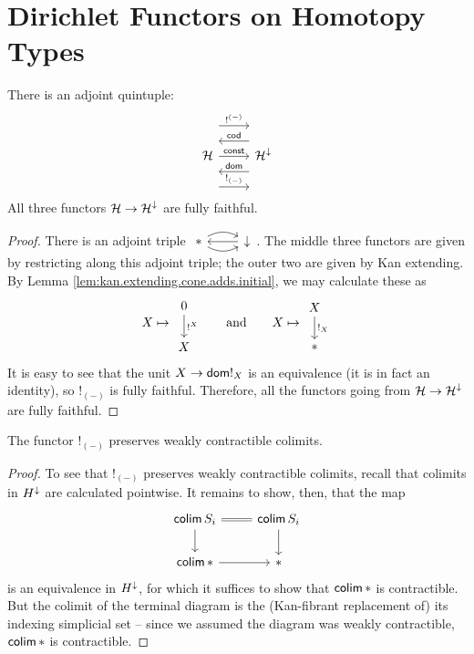 \section{Dirichlet Functors on Homotopy Types} \label{sec:type.level}

\begin{prop}
  There is an adjoint quintuple:
  \[
    \begin{tikzcd}
      \Ha \arrow[r, "\const"] \arrow[r, leftarrow, shift left = 5,
      "\term{cod}"] \arrow[r, leftarrow, shift right = 5, "\term{dom}"]
      \arrow[r, shift left = 10, "!^{(-)}"]  \arrow[r, shift right = 10, "!_{(-)}"] & \Ha^{\down}
    \end{tikzcd}
  \]
  All three functors $\operatorname{\mathcal{H}} \to \operatorname{\mathcal{H}}^{\mathbin{\downarrow}}$ are fully faithful.
\end{prop}
\begin{proof}
There is an adjoint triple $\begin{tikzcd} \ast \arrow[r,leftarrow] \arrow[r,
  bend left] \arrow[r, bend right] & \down \end{tikzcd}$. The middle three
functors are given by restricting along this adjoint triple; the outer two are
given by Kan extending. By Lemma \ref{lem:kan.extending.cone.adds.initial}, we
may calculate these as
  $$X \mapsto \begin{tikzcd} 0 \arrow[d, "!^X"] \\ X \end{tikzcd}
  \qquad\text{and}\qquad
  X \mapsto \begin{tikzcd} X \arrow[d, "!_X"] \\ \ast \end{tikzcd}$$
It is easy to see that the unit $X \to \mathsf{{dom}} !_{X}$ is an equivalence (it is in
fact an identity), so $!_{(-)}$ is fully faithful. Therefore, all the functors
going from $\operatorname{\mathcal{H}} \to \operatorname{\mathcal{H}}^{\mathbin{\downarrow}}$ are fully faithful.
\end{proof}


\begin{prop}\label{lem:bang.preserves.weakly.contractible.colimits}
  The functor $!_{(-)}$ preserves weakly contractible colimits.
\end{prop}
\begin{proof}
  To see that $!_{(-)}$ preserves weakly contractible colimits, recall that colimits in $H^{\mathbin{\downarrow}}$ are calculated pointwise. It remains to show, then, that the map
  \[
    \begin{tikzcd}
    \colim S_i \arrow[r, equals] \arrow[d] & \colim S_i \arrow[d] \\
    \colim \ast \arrow[r] & \ast 
    \end{tikzcd}
  \]
  is an equivalence in $H^{\mathbin{\downarrow}}$, for which it suffices to show that $\operatorname{\mathsf{colim}} \ast$ is contractible. But the colimit of the terminal diagram is the (Kan-fibrant replacement of) its indexing simplicial set -- since we assumed the diagram was weakly contractible, $\operatorname{\mathsf{colim}} \ast$ is contractible.
\end{proof}

